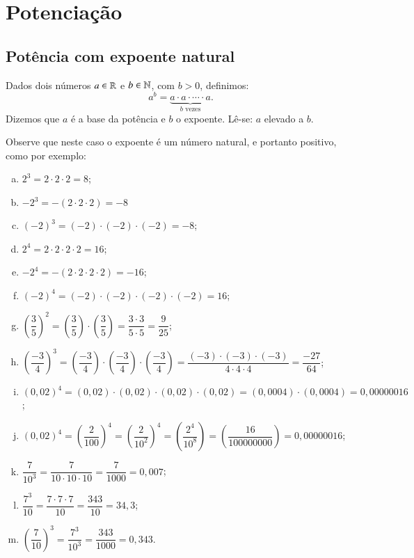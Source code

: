  \chapter{Potenciação}

 \section{Potência com expoente natural}

 \vskip0.3cm

 \colorbox{azul}{
 \begin{minipage}{0.9\linewidth}
 \begin{center}
  Dados dois números $a \in \mathbb{R}$ e $b \in \mathbb{N}$, com $b > 0$, definimos:
 \[a^b= \underbrace{a \cdot a \cdot \cdots \cdot a}_{b \text{ vezes}} .\]
  Dizemos que $a$ é a base da potência e $b$ o expoente. Lê-se: $a$ elevado a $b$.
 \end{center}
 \end{minipage}}

 \vskip0.3cm

 \begin{exem}
 Observe que neste caso o expoente é um número natural, e portanto positivo, como por exemplo:

 \begin{enumerate}[a)]
  \item $2^3= 2 \cdot 2 \cdot 2= 8$;
  \item $-2^3= -(2 \cdot 2 \cdot 2)= -8$
  \item $(-2)^3= (-2) \cdot (-2) \cdot (-2)= -8$;
  \item $2^4=2 \cdot 2 \cdot 2 \cdot  2= 16$;
  \item $-2^4= -(2 \cdot 2 \cdot 2 \cdot 2)= -16$;
  \item $(-2)^4= (-2) \cdot (-2) \cdot (-2) \cdot (-2)= 16$;
  \item $\left(\dfrac{3}{5}\right)^2= \left(\dfrac{3}{5}\right) \cdot \left(\dfrac{3}{5}\right)= \dfrac{3 \cdot 3}{5 \cdot 5}= \dfrac{9}{25}$;
  \item $\left(\dfrac{-3}{4}\right)^3= \left(\dfrac{-3}{4}\right) \cdot \left(\dfrac{-3}{4}\right) \cdot \left(\dfrac{-3}{4}\right)= \dfrac{(-3) \cdot (-3) \cdot (-3)}{4 \cdot 4 \cdot 4}= \dfrac{-27}{64}$;
  \item $(0,02)^4= (0,02) \cdot (0,02) \cdot (0,02) \cdot (0,02)= (0,0004) \cdot (0,0004)= 0,00000016$;
  \item $(0,02)^4= \left(\dfrac{2}{100}\right)^4= \left(\dfrac{2}{10^2}\right)^4= \left(\dfrac{2^4}{10^8}\right)= \left(\dfrac{16}{100000000}\right)= 0,00000016$;
  \item $\dfrac{7}{10^3}= \dfrac{7}{10 \cdot 10 \cdot 10}= \dfrac{7}{1000}= 0,007$;
  \item $\dfrac{7^3}{10}=  \dfrac{7 \cdot 7 \cdot 7}{10}= \dfrac{343}{10}=34,3$;
  \item $\left(\dfrac{7}{10}\right)^3= \dfrac{7^3}{10^3}= \dfrac{343}{1000}= 0,343$.
  \end{enumerate}

 \end{exem}

